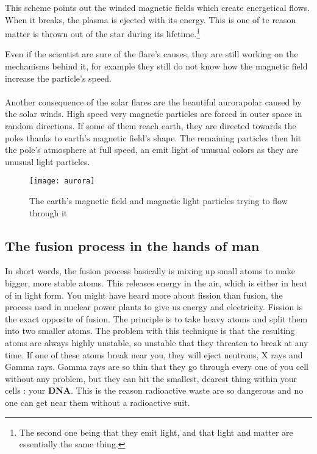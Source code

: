 \documentclass[a4paper, 11pt]{article} %
\begin{document}
This scheme points out the winded magnetic fields which create energetical flows. When it breaks, the plasma is ejected with its energy. This is one of te reason matter is thrown out of the star during its lifetime.\footnote{The second one being that they emit light, and that light and matter are essentially the same thing.} 

Even if the scientist are sure of the flare's causes, they are still working on the mechanisms behind it, for example they still do not know how the magnetic field increase the particle's speed. 

\paragraph*{}
Another consequence of the solar flares are the beautiful aurorapolar caused by the solar winds. High speed very magnetic particles are forced in outer space in random directions. If some of them reach earth, they are directed towards the poles thanks to earth's magnetic field's shape. The remaining particles then hit the pole's atmosphere at full speed, an emit light of unusual colors as they are unusual light particles.

\newpage
\begin{figure}[h]
\centering
\texttt{[image: aurora]}
\caption{The earth's magnetic field and magnetic light particles trying to flow through it}
\end{figure}

\subsection{The fusion process in the hands of man}

In short words, the fusion process basically is mixing up small atoms to make bigger, more stable atoms. This releases energy in the air, which is either in heat of in light form. You might have heard more about fission than fusion, the process used in nuclear power plants to give us energy and electricity. Fission is the exact opposite of fusion. The principle is to take heavy atoms and split them into two smaller atoms. The problem with this technique is that the resulting atoms are always highly unstable, so unstable that they threaten to break at any time. If one of these atoms break near you, they will eject neutrons, X rays and Gamma rays. Gamma rays are so thin that they go through every one of you cell without any problem, but they can hit the smallest, dearest thing within your cells : your \textbf{DNA}. This is the reason radioactive waste are so dangerous and no one can get near them without a radioactive suit.
\end{document}
